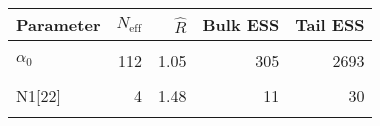 \begin{table}[!h]
\centering
\begin{tabular}{>{\raggedright\arraybackslash}p{2cm}rrrr}
\toprule
Parameter & $N_{\text{eff}}$ & $\widehat{R}$ & Bulk ESS & Tail ESS\\
\midrule
\cellcolor{gray!6}{$\rho$} & \cellcolor{gray!6}{38308} & \cellcolor{gray!6}{1.00} & \cellcolor{gray!6}{38544} & \cellcolor{gray!6}{40873}\\
$\alpha_{0}$ & 112 & 1.05 & 305 & 2693\\
\cellcolor{gray!6}{$\alpha_{2}$} & \cellcolor{gray!6}{5} & \cellcolor{gray!6}{1.33} & \cellcolor{gray!6}{14} & \cellcolor{gray!6}{1989}\\
N1[22] & 4 & 1.48 & 11 & 30\\
\cellcolor{gray!6}{Nadimm[23]} & \cellcolor{gray!6}{6} & \cellcolor{gray!6}{1.33} & \cellcolor{gray!6}{14} & \cellcolor{gray!6}{6}\\
\bottomrule
\end{tabular}
\end{table}